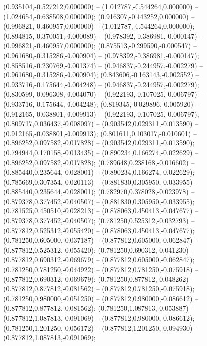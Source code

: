  (0.935104,-0.527212,0.000000) -- (1.012787,-0.544264,0.000000) -- (1.024654,-0.638508,0.000000);
 (0.916307,-0.443252,0.000000) -- (0.996821,-0.460957,0.000000) -- (1.012787,-0.544264,0.000000);
 (0.894815,-0.370051,-0.000089) -- (0.978392,-0.386981,-0.000147) -- (0.996821,-0.460957,0.000000);
 (0.875513,-0.299590,-0.000547) -- (0.961680,-0.315286,-0.000904) -- (0.978392,-0.386981,-0.000147);
 (0.858516,-0.230769,-0.001374) -- (0.946837,-0.244957,-0.002279) -- (0.961680,-0.315286,-0.000904);
 (0.843606,-0.163143,-0.002552) -- (0.933716,-0.175644,-0.004248) -- (0.946837,-0.244957,-0.002279);
 (0.830599,-0.096308,-0.004070) -- (0.922193,-0.107025,-0.006797) -- (0.933716,-0.175644,-0.004248);
 (0.819345,-0.029896,-0.005920) -- (0.912165,-0.038801,-0.009913) -- (0.922193,-0.107025,-0.006797);
 (0.809717,0.036437,-0.008097) -- (0.903542,0.029311,-0.013590) -- (0.912165,-0.038801,-0.009913);
 (0.801611,0.103017,-0.010601) -- (0.896252,0.097582,-0.017828) -- (0.903542,0.029311,-0.013590);
 (0.794944,0.170158,-0.013435) -- (0.890234,0.166274,-0.022629) -- (0.896252,0.097582,-0.017828);
 (0.789648,0.238168,-0.016602) -- (0.885440,0.235644,-0.028001) -- (0.890234,0.166274,-0.022629);
 (0.785669,0.307354,-0.020113) -- (0.881830,0.305950,-0.033955) -- (0.885440,0.235644,-0.028001);
 (0.782970,0.378028,-0.023978) -- (0.879378,0.377452,-0.040507) -- (0.881830,0.305950,-0.033955);
 (0.781525,0.450510,-0.028213) -- (0.878063,0.450413,-0.047677) -- (0.879378,0.377452,-0.040507);
 (0.781250,0.525312,-0.032793) -- (0.877812,0.525312,-0.055420) -- (0.878063,0.450413,-0.047677);
 (0.781250,0.605000,-0.037187) -- (0.877812,0.605000,-0.062847) -- (0.877812,0.525312,-0.055420);
 (0.781250,0.690312,-0.041230) -- (0.877812,0.690312,-0.069679) -- (0.877812,0.605000,-0.062847);
 (0.781250,0.781250,-0.044922) -- (0.877812,0.781250,-0.075918) -- (0.877812,0.690312,-0.069679);
 (0.781250,0.877812,-0.048262) -- (0.877812,0.877812,-0.081562) -- (0.877812,0.781250,-0.075918);
 (0.781250,0.980000,-0.051250) -- (0.877812,0.980000,-0.086612) -- (0.877812,0.877812,-0.081562);
 (0.781250,1.087813,-0.053887) -- (0.877812,1.087813,-0.091069) -- (0.877812,0.980000,-0.086612);
 (0.781250,1.201250,-0.056172) -- (0.877812,1.201250,-0.094930) -- (0.877812,1.087813,-0.091069);
